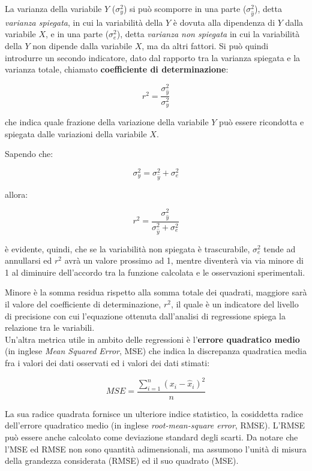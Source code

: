 La varianza della variabile $Y$ ($\sigma_{y}^{2}$) si può scomporre in una parte ($\sigma_{\hat{y}}^{2}$), detta \textit{varianza spiegata}, in cui la variabilità della $Y$ è dovuta alla dipendenza di $Y$ dalla variabile $X$, e in una parte ($\sigma_{e}^{2}$), detta \textit{varianza non spiegata} in cui la  variabilità della $Y$ non dipende dalla variabile $X$, ma da altri fattori. Si può quindi introdurre un secondo indicatore, dato dal rapporto tra la varianza spiegata e la varianza totale, chiamato \textbf{coefficiente di determinazione}:

$$r^{2}=\frac{\sigma_{\hat{y}}^{2}}{\sigma_{y}^{2}}$$\smallskip

che indica quale frazione della variazione della variabile $Y$ può essere ricondotta e spiegata dalle variazioni della variabile $X$.

Sapendo che:

$$\sigma_{y}^{2}=\sigma_{\hat{y}}^{2}+\sigma_{e}^{2}$$

allora:

$$r^{2}=\frac{\sigma_{\hat{y}}^{2}}{\sigma_{\hat{y}}^{2}+\sigma_{e}^{2}}$$\smallskip

è evidente, quindi, che se la variabilità non spiegata è trascurabile, $\sigma_{e}^{2}$ tende ad annullarsi ed $r^{2}$ avrà un valore prossimo ad 1, mentre diventerà via via minore di 1 al diminuire dell’accordo tra la funzione calcolata e le osservazioni sperimentali.

Minore è la somma residua rispetto alla somma totale dei quadrati, maggiore sarà il valore del coefficiente di determinazione, $r^2$, il quale è un indicatore del livello di precisione con cui l'equazione ottenuta dall'analisi di regressione spiega la relazione tra le variabili. \cite{linear_models}\\

Un'altra metrica utile in ambito delle regressioni è l'\textbf{errore quadratico medio} (in inglese \textit{Mean Squared Error}, MSE) che indica la discrepanza quadratica media fra i valori dei dati osservati ed i valori dei dati stimati:

$$MSE=\frac{\sum_{i=1}^{n}\left(x_{i}-\widehat{x}_{i}\right)^{2}}{n}$$\smallskip

La sua radice quadrata fornisce un ulteriore indice statistico, la cosiddetta radice dell'errore quadratico medio (in inglese \textit{root-mean-square error}, RMSE). L'RMSE può essere anche calcolato come deviazione standard degli scarti. Da notare che l'MSE ed RMSE non sono quantità adimensionali, ma assumono l'unità di misura della grandezza considerata (RMSE) ed il suo quadrato (MSE). 

